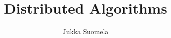 \makeatletter
\renewcommand\maketitle{\begin{titlepage}
    \vspace*{\stretch{1}}
    \begin{center}
        {\Huge \@title \par}%
        \vspace{15mm}%
        {\LARGE \@author \par}%
        \vspace{3mm}
        {\large \myaffiliation \par}%
        \vspace{3mm}
        {\large \@date \par}%
        \vspace{20mm}
        {\large \mycovernote\par}
    \end{center}%
    \vspace*{\stretch{1}}
\end{titlepage}}
\makeatother

\title{Distributed Algorithms}
\author{Jukka Suomela}
\newcommand{\myaffiliation}{Aalto University, Finland}
\newcommand{\mycovernote}{%
    This is a preliminary version, \\
    see the website for updates: \\ 
    \url{http://users.ics.aalto.fi/suomela/da/}
}



\newcommand{\dinput}[1]{This chapter will be published later.}
